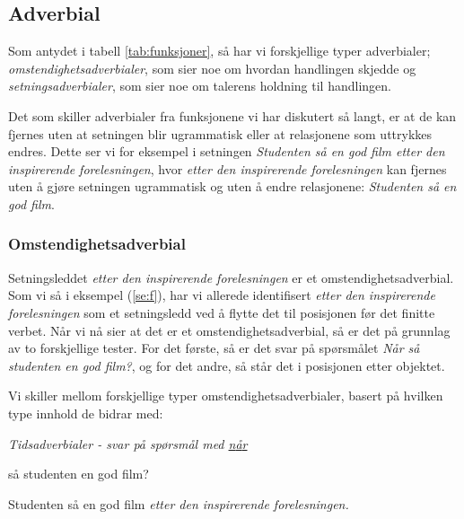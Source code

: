 \documentclass{article}
\begin{document}
\subsection{Adverbial}

Som antydet i tabell \ref{tab:funksjoner}, s{\aa} har vi forskjellige typer adverbialer; {\it omstendighetsadverbialer}, som sier noe om hvordan handlingen skjedde og {\it setningsadverbialer}, som sier noe om talerens holdning til handlingen.%

Det som skiller adverbialer fra funksjonene vi har diskutert s{\aa} langt, er at de kan fjernes uten at setningen blir ugrammatisk eller at relasjonene som uttrykkes endres. Dette ser vi for eksempel i setningen {\it Studenten s{\aa} en god film etter den inspirerende forelesningen}, hvor {\it etter den inspirerende forelesningen} kan fjernes uten {\aa} gj{\o}re setningen ugrammatisk og uten {\aa} endre relasjonene: {\it  Studenten s{\aa} en god film}.

\subsubsection{Omstendighetsadverbial}

Setningsleddet {\it etter den inspirerende forelesningen} er et omstendighetsadverbial. Som vi s{\aa} i eksempel (\ref{se:f}), har vi allerede identifisert {\it etter den inspirerende forelesningen} som et setningsledd ved {\aa} flytte det til posisjonen f{\o}r det finitte verbet. N{\aa}r vi n{\aa} sier at det er et omstendighetsadverbial, s{\aa} er det p{\aa} grunnlag av to forskjellige tester. For det f{\o}rste, s{\aa} er det svar p{\aa} sp{\o}rsm{\aa}let {\it N{\aa}r s{\aa} studenten en god film?}, og for det andre, s{\aa} st{\aa}r det i posisjonen etter objektet. 

Vi skiller mellom forskjellige typer omstendighetsadverbialer, basert p{\aa} hvilken type innhold de bidrar med:

{\it Tidsadverbialer - svar p{\aa} sp{\o}rsm{\aa}l med \underline{n{\aa}r}}

\begin{exe}
\ex
\begin{xlist}
 s{\aa} studenten en god film?

\ex Studenten s{\aa} en god film {\it etter den inspirerende forelesningen.}
\end{xlist}
\end{exe}
\end{document}
